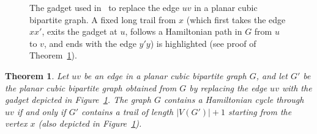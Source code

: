 \documentclass{article}
\theoremstyle{plain}
\newtheorem{theorem}{Theorem}
\theoremstyle{definition}
\begin{document}
\begin{figure}[hbt]
    \caption{The gadget used in~\cite[Theorem 23]{MUNARO20171210} to replace the edge $uv$ in a planar cubic bipartite graph. A fixed long trail from $x$ (which first takes the edge $xx'$, exits the gadget at $u$, follows a Hamiltonian path in $G$ from $u$ to $v$, and ends with the edge $y'y$) is highlighted (see proof of Theorem~\ref{thm:fixedlongtrail}).}
    \label{fig:fixedlongtrail}
\end{figure}


\begin{theorem}\label{thm:fixedlongtrail}
    Let $uv$ be an edge in a planar cubic bipartite graph $G$, and let $G'$ be the planar cubic bipartite graph obtained from $G$ by replacing the edge $uv$ with the gadget depicted in Figure~\ref{fig:fixedlongtrail}.
    The graph $G$ contains a Hamiltonian cycle through $uv$ if and only if $G'$ contains a trail of length $|V(G')| + 1$
    starting from the vertex $x$ (also depicted in Figure~\ref{fig:fixedlongtrail}).
\end{theorem}
\end{document}
